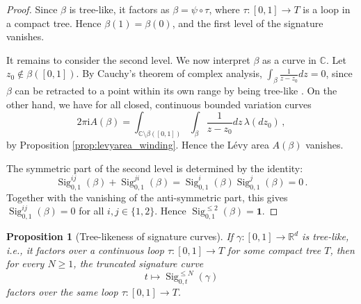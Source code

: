 \documentclass[10pt,a4paper]{amsart}
\newtheorem{proposition}[theorem]{Proposition}
\newcommand{\R}{\mathbb{R}}
\newcommand{\Sig}{\operatorname{Sig}}
\newcommand{\id}{\mathbf{1}}
\begin{document}
\begin{proof}
  Since $\beta$ is tree-like, it factors as $\beta=\psi\circ\tau$, where $\tau:[0,1] \to T$ is a loop in a compact tree. Hence $\beta(1)=\beta(0)$, and the first level of the signature vanishes.

It remains to consider the second level. We now interpret $\beta$ as a curve in $\mathbb{C}$. Let $ z_0 \notin \beta([0,1]) $. By Cauchy's theorem of complex analysis, $\int_\beta \frac{1}{z-z_0} d z=0$, since $\beta$ can be retracted to a point within its own range by being tree-like \cite[Theorem 5.15]{L2017}. On the other hand, we have for all closed, continuous bounded variation curves
\[
2 \pi \textrm{i} A(\beta) = \int_{\mathbb{C} \setminus \beta([0,1])} \int_{\beta} \frac{1}{z-z_0} d z \, \lambda(dz_0) \, ,
\]  
by Proposition \ref{prop:levyarea_winding}. Hence the L\'evy area $A(\beta)$ vanishes.

The symmetric part of the second level is determined by the identity:
\[
   \Sig^{ij}_{0,1}(\beta)+  \Sig^{ji}_{0,1}(\beta)
  =
  \Sig^i_{0,1}(\beta)  \Sig^j_{0,1}(\beta)=0 \, .
\]
Together with the vanishing of the anti-symmetric part, this gives $\Sig^{ij}_{0,1}(\beta)=0$ for all $i,j\in\{1,2\}$. Hence $\Sig^{\leq 2}_{0,1}(\beta)=\id$.
\end{proof}

\begin{proposition}[Tree-likeness of signature curves]\label{prop:lifts-tree-like}
If $ \gamma:[0,1]\to\R^d $ is tree-like, i.e., it factors over a continuous loop $ \tau:[0,1] \to T $ for some compact tree $T$, then for every $N\geq 1$, the truncated signature curve
\[
  t\longmapsto \Sig^{\leq N}_{0,t}(\gamma)
\]
factors over the same loop $\tau: [0,1] \to T$.
\end{proposition}
\end{document}
